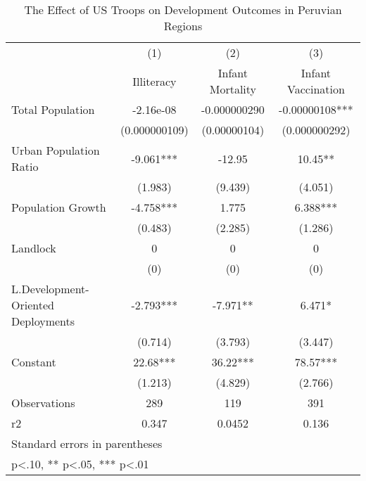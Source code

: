 \documentclass[12pt]{article}
\begin{document}
\begin{doublespace}
\begin{table}[htbp]\centering
\def\sym#1{\ifmmode^{#1}\else\(^{#1}\)\fi}
\caption{The Effect of US Troops on Development Outcomes in Peruvian Regions}
\begin{tabular}{l*{3}{c}}
\hline\hline
                    &\multicolumn{1}{c}{(1)}&\multicolumn{1}{c}{(2)}&\multicolumn{1}{c}{(3)}\\
                    &\multicolumn{1}{c}{Illiteracy}&\multicolumn{1}{c}{Infant Mortality}&\multicolumn{1}{c}{Infant Vaccination}\\
\hline
Total Population    &   -2.16e-08   &-0.000000290   & -0.00000108***\\
                    &(0.000000109)   &(0.00000104)   &(0.000000292)   \\
[1em]
Urban Population Ratio&      -9.061***&      -12.95   &       10.45** \\
                    &     (1.983)   &     (9.439)   &     (4.051)   \\
[1em]
Population Growth   &      -4.758***&       1.775   &       6.388***\\
                    &     (0.483)   &     (2.285)   &     (1.286)   \\
[1em]
Landlock            &           0   &           0   &           0   \\
                    &         (0)   &         (0)   &         (0)   \\
[1em]
L.Development-Oriented Deployments&      -2.793***&      -7.971** &       6.471*  \\
                    &     (0.714)   &     (3.793)   &     (3.447)   \\
[1em]
Constant            &       22.68***&       36.22***&       78.57***\\
                    &     (1.213)   &     (4.829)   &     (2.766)   \\
\hline
Observations        &         289   &         119   &         391   \\
r2                  &       0.347   &      0.0452   &       0.136   \\
\hline\hline
\multicolumn{4}{l}{\footnotesize Standard errors in parentheses}\\
\multicolumn{4}{l}{\footnotesize * p<.10, ** p<.05, *** p<.01}\\
\end{tabular}
\end{table}



\end{doublespace}
\end{document}
